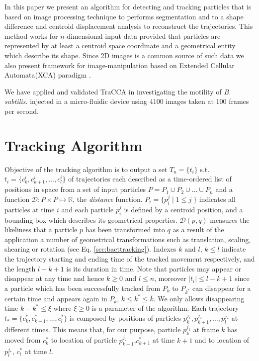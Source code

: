 \documentclass[conference]{IEEEtran}
\begin{document}
In this paper we present an algorithm for detecting and tracking particles that is based on image processing technique to performs segmentation and to a shape difference and centroid displacement analysis to reconstruct the trajectories. 
This method works for $n$-dimensional input data provided that particles are represented by at least a centroid space coordinate and a geometrical entity which describe its shape. 
Since 2D images is a common source of such data we also present framework for image-manipulation based on Extended Cellular Automata(XCA) paradigm .

We have applied and validated TraCCA in investigating the motility of \textit{B. subtilis.} injected in a micro-fluidic device using 4100 images taken at 100 frames per second. 



\section{Tracking Algorithm}
Objective of the tracking algorithm is to output a 
set $ T_n = \{ t_i \}$  s.t.  $t_i=\{ c^i_k,c^i_{k+1},\ldots,c^i_l \} $ 
of trajectories each described as a time-ordered list of positions  in space from a set of input 
particles $P=P_1 \cup P_2 \cup \ldots \cup P_n$ and a function $\mathcal{D} :  P \times P \mapsto \mathbb{R}$, 
the \textit{distance} function. $P_i = \{p^j_i \; | \; 1 \leq j\; \}$ indicates all particles at time $i$ and each particle $p_i^j$ is defined by a centroid position, and a bounding box which describes its geometrical properties.
$\mathcal{D}(p,q)$ measures the likeliness that a particle $p$ has been transformed into $q$ as a result of the application a number of geometrical transformations such as translation, scaling, shearing or rotation (see Eq. \ref{sec:bacttracking}). 
Indexes $k$ and $l$, $k \leq l$ indicate the trajectory starting and ending time of the tracked movement respectively, and the length $l-k+1$ is its duration in time.
Note that particles may appear or disappear at any time and hence $k\geq 0$ and $l \leq n$, moreover $|t_i| \leq l-k+1$ since a particle which has been successfully tracked
 from  $P_k$ to $P_{k^*} $ can disappear for a certain time and appears again in $P_{\bar{k}}$, $k \leq k^* \leq \bar{k}$. We only allows disappearing time $\bar{k}-k^* \leq \xi$ where $\xi \geq 0$ is a parameter of the algorithm. 
Each trajectory  $t_*=\{ c^*_k,c^*_{k+1},\ldots,c^*_l \} $ is composed by  positions of particles $p^{j_1}_k,p^{j_2}_{k+1},\ldots,p^{j_*}_l$ at different times. 
This means that, for our purpose, particle $p^{j_1}_k$ at frame $k$ has moved from $c^*_k$ to location of particle $p^{j_2}_{k+1}$,$c^*_{k+1}$ at time ${k+1}$ and to location of $p^{j_*}_{l}$, $c^*_l$ at time $l$. 
\end{document}
